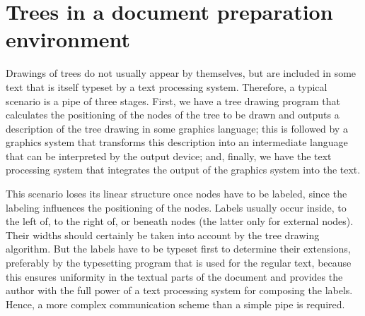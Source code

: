 

\section{Trees in a document preparation environment}

Drawings of trees do not usually appear by themselves,
but are included in some text
that is itself typeset by a text processing system. Therefore, a typical
scenario is a pipe of three stages. First, we have a tree drawing
program that calculates the positioning of the nodes of the tree to
be drawn and outputs a description of the tree drawing in
some graphics language; this is followed by
a graphics system that transforms this
description into an intermediate language that can be interpreted by the output
device; and, finally, we have the
text processing system that integrates the output of the
graphics system into the text.

This scenario loses its linear structure once nodes have to be labeled, since
the labeling influences the positioning of the nodes. Labels usually occur
inside, to the left of, to the right of, or beneath nodes (the latter only for
external nodes). Their widths should certainly be taken into account
by the  tree drawing algorithm. But the labels have to be typeset first
to determine their extensions,
preferably by the typesetting program that
is used for the regular text, because this ensures uniformity in the textual
parts of the document and provides the author with the full power of a
text processing system for composing the labels. Hence, a more complex
communication scheme than a simple pipe is required.

